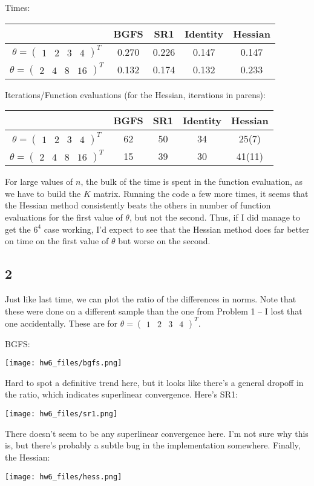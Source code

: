 \documentclass{article}
\newcommand{\openm}{\begin{pmatrix}}
\newcommand{\closem}{\end{pmatrix}}
\begin{document}
Times:
\begin{tabular}{|c|cccc|}
    \hline 
    &BGFS&SR1&Identity&Hessian\\
    \hline
    $\theta=\openm1&2&3&4\closem^T$&0.270&0.226&0.147&0.147\\
    $\theta=\openm2&4&8&16\closem^T$&0.132&0.174&0.132&0.233\\
    \hline
\end{tabular}

Iterations/Function evaluations (for the Hessian, iterations in parens):

\begin{tabular}{|c|cccc|}
    \hline 
    &BGFS&SR1&Identity&Hessian\\
    \hline
    $\theta=\openm1&2&3&4\closem^T$&62&50&34&25(7)\\
    $\theta=\openm2&4&8&16\closem^T$&15&39&30&41(11)\\
    \hline
\end{tabular}
For large values of $n$, the bulk of the time is spent in the function evaluation, as we have to build the $K$ matrix. Running the code a few more times, it seems that the Hessian method consistently beats the others in number of function evaluations for the first value of $\theta$, but not the second. Thus, if I did manage to get the $6^4$ case working, I'd expect to see that the Hessian method does far better on time on the first value of $\theta$ but worse on the second.
\subsection*{2}
Just like last time, we can plot the ratio of the differences in norms. Note that these were done on a different sample than the one from Problem 1 -- I lost that one accidentally. These are for $\theta=\openm1&2&3&4\closem^T$.

BGFS:

\texttt{[image: hw6\_files/bgfs.png]}

Hard to spot a definitive trend here, but it looks like there's a general dropoff in the ratio, which indicates superlinear convergence. Here's SR1:

\texttt{[image: hw6\_files/sr1.png]}

There doesn't seem to be any superlinear convergence here. I'm not sure why this is, but there's probably a subtle bug in the implementation somewhere. Finally, the Hessian:

\texttt{[image: hw6\_files/hess.png]}
\end{document}
